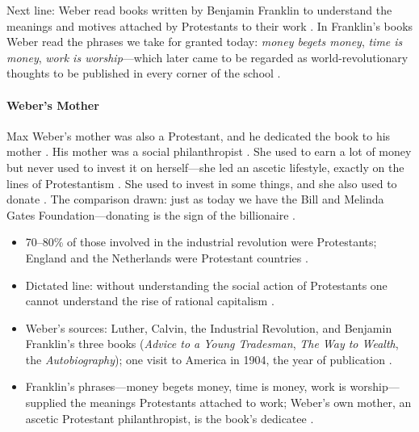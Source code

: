 \begin{KeyConcept}
Next line: Weber read books written by Benjamin Franklin to understand the meanings and motives attached by Protestants to their work .
In Franklin's books Weber read the phrases we take for granted today: \textit{money begets money}, \textit{time is money}, \textit{work is worship}---which later came to be regarded as world-revolutionary thoughts to be published in every corner of the school .
\end{KeyConcept}

\paragraph{Weber's Mother}
Max Weber's mother was also a Protestant, and he dedicated the book to his mother .
His mother was a social philanthropist . She used to earn a lot of money but never used to invest it on herself---she led an ascetic lifestyle, exactly on the lines of Protestantism . She used to invest in some things, and she also used to donate .
The comparison drawn: just as today we have the Bill and Melinda Gates Foundation---donating is the sign of the billionaire .

\begin{QuickRevision}
\begin{itemize}
    \item 70--80\% of those involved in the industrial revolution were Protestants; England and the Netherlands were Protestant countries .
    \item Dictated line: without understanding the social action of Protestants one cannot understand the rise of rational capitalism .
    \item Weber's sources: Luther, Calvin, the Industrial Revolution, and Benjamin Franklin's three books (\textit{Advice to a Young Tradesman}, \textit{The Way to Wealth}, the \textit{Autobiography}); one visit to America in 1904, the year of publication .
    \item Franklin's phrases---money begets money, time is money, work is worship---supplied the meanings Protestants attached to work; Weber's own mother, an ascetic Protestant philanthropist, is the book's dedicatee .
\end{itemize}
\end{QuickRevision}

